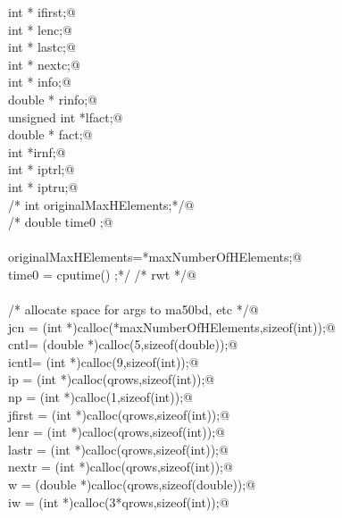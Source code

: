 \documentclass[12pt]{article}
\begin{document}
\begin{flushleft}
\begin{minipage}{\linewidth}
\begin{list}{}{}
\mbox{}\verb@        int * ifirst;@\\
\mbox{}\verb@        int * lenc;@\\
\mbox{}\verb@        int * lastc;@\\
\mbox{}\verb@        int * nextc;@\\
\mbox{}\verb@        int * info;@\\
\mbox{}\verb@        double * rinfo;@\\
\mbox{}\verb@        unsigned int *lfact;@\\
\mbox{}\verb@        double * fact;@\\
\mbox{}\verb@        int *irnf;@\\
\mbox{}\verb@        int * iptrl;@\\
\mbox{}\verb@        int * iptru;@\\
\mbox{}\verb@/*      int originalMaxHElements;*/@\\
\mbox{}\verb@/*      double time0 ;@\\
\mbox{}\verb@@\\
\mbox{}\verb@        originalMaxHElements=*maxNumberOfHElements;@\\
\mbox{}\verb@        time0 = cputime() ;*/ /* rwt */@\\
\mbox{}\verb@@\\
\mbox{}\verb@        /* allocate space for args to ma50bd, etc */@\\
\mbox{}\verb@        jcn = (int *)calloc(*maxNumberOfHElements,sizeof(int));@\\
\mbox{}\verb@        cntl= (double *)calloc(5,sizeof(double));@\\
\mbox{}\verb@        icntl= (int *)calloc(9,sizeof(int));@\\
\mbox{}\verb@        ip = (int *)calloc(qrows,sizeof(int));@\\
\mbox{}\verb@        np = (int *)calloc(1,sizeof(int));@\\
\mbox{}\verb@        jfirst = (int *)calloc(qrows,sizeof(int));@\\
\mbox{}\verb@        lenr = (int *)calloc(qrows,sizeof(int));@\\
\mbox{}\verb@        lastr = (int *)calloc(qrows,sizeof(int));@\\
\mbox{}\verb@        nextr = (int *)calloc(qrows,sizeof(int));@\\
\mbox{}\verb@        w = (double *)calloc(qrows,sizeof(double));@\\
\mbox{}\verb@        iw = (int *)calloc(3*qrows,sizeof(int));@\\

\end{list}
\end{minipage}
\end{flushleft}
\end{document}
